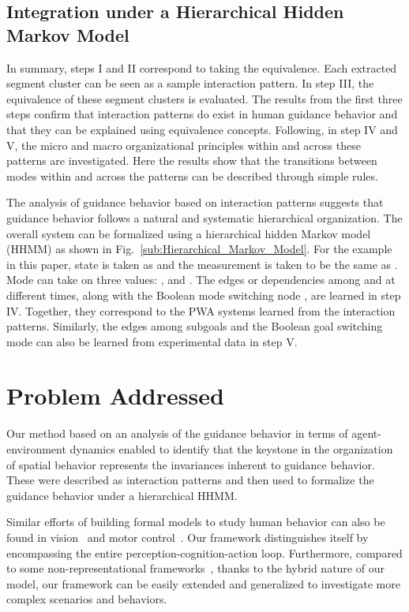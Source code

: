 \documentclass[journal]{IEEEtran}
\begin{document}
\subsection{Integration under a Hierarchical Hidden Markov Model}

In summary, steps I and II correspond to taking the  equivalence. Each extracted segment cluster can be seen as a sample interaction pattern. In step III, the  equivalence of these segment clusters is evaluated. The results from the first three steps confirm that interaction patterns do exist in human guidance behavior and that they can be explained using equivalence concepts. Following, in step IV and V, the micro and macro organizational principles within and across these patterns are investigated. Here the results show that the transitions between modes within and across the patterns can be described through simple rules.

The analysis of guidance behavior based on interaction patterns suggests that guidance behavior follows a natural and systematic hierarchical organization. The overall system can be formalized using a hierarchical hidden Markov model (HHMM) as shown in Fig.~\ref{sub:Hierarchical_Markov_Model}. For the example in this paper, state  is taken as  and the measurement is taken to be the same as . Mode  can take on three values: ,  and . The edges or dependencies among  and  at different times, along with the Boolean mode switching node , are learned in step IV. Together, they correspond to the PWA systems learned from the interaction patterns.  Similarly, the edges among subgoals  and the Boolean goal switching mode  can also be learned from experimental data in step V.  

\section{Problem Addressed}

Our method based on an analysis of the guidance behavior in terms of agent-environment dynamics enabled to identify that the keystone in the organization of spatial behavior represents the invariances inherent to guidance behavior. These were described as interaction patterns and then used to formalize the guidance behavior under a hierarchical HHMM.  

Similar efforts of building formal models to study human behavior can also be found in vision~\cite{mumford2002pattern} and motor control~\cite{wolpert2000computational}. Our framework distinguishes itself by encompassing the entire perception-cognition-action loop. Furthermore, compared to some non-representational frameworks~\cite{lee1998guiding,warren2006dynamics}, thanks to the hybrid nature of our model, our framework can be easily extended and generalized to investigate more complex scenarios and behaviors.
\end{document}
